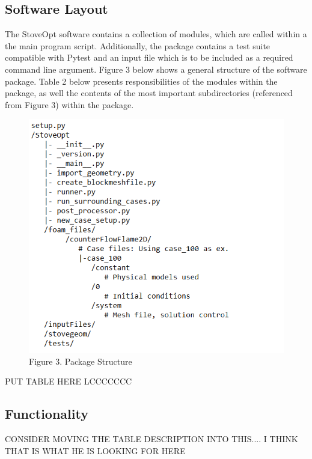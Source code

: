 \documentclass[3p,times,twocolumn]{elsarticle}
\begin{document}
\subsection{Software Layout}
The StoveOpt software contains a collection of modules, which are called within a the main program script. Additionally, the package contains a test suite compatible with Pytest and an input file which is to be included as a required command line argument. Figure 3 below shows a general structure of the software package. Table 2 below presents responsibilities of the modules within the package, as well the contents of the most important subdirectories (referenced from Figure 3) within the package.

\begin{figure}{\linewidth}
	\includegraphics[width=\linewidth]{skeleton.PNG}
	\caption{Figure 3. Package Structure}
\end{figure}


PUT TABLE HERE LCCCCCCC



\subsection{Functionality}

CONSIDER MOVING THE TABLE DESCRIPTION INTO THIS.... I THINK THAT IS WHAT HE IS LOOKING FOR HERE
\end{document}
